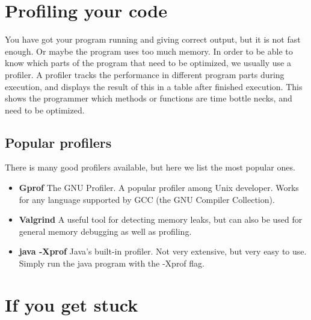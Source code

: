 \documentclass[11pt,a4paper,twoside]{article}
\begin{document}

\section{Profiling your code}
You have got your program running and giving correct output, but it is not fast
enough. Or maybe the program uses too much memory. 
In order to be able to know which parts of the program that need to be
optimized, we usually use a profiler.  A profiler tracks the performance in
different program parts during execution, and displays the result of this in a
table after finished execution. This shows the programmer which methods or
functions are time bottle necks, and need to be optimized.

\subsection{Popular profilers}
There is many good profilers available, but here we list the most popular ones.
\begin{itemize}
    \item \textbf{Gprof} The GNU Profiler. A popular profiler among Unix developer.
    Works for any language supported by GCC (the GNU Compiler Collection).

    \item \textbf{Valgrind} A useful tool for detecting memory leaks, but can also be
    used for general memory debugging as well as profiling.

    \item \textbf{java -Xprof} Java's built-in profiler. Not very extensive, but very
    easy to use.  Simply run the java program with the -Xprof flag.

\end{itemize}

\section{If you get stuck}
\end{document}
